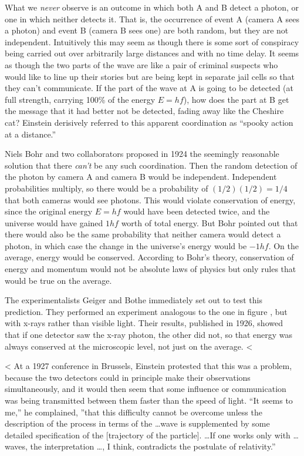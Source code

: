 What we \emph{never} observe is an outcome in which both A and B
detect a photon, or one in which neither detects it. That is, the
occurrence of event A (camera A sees a photon) and event B (camera B
sees one) are both random, but they are not independent. Intuitively
this may seem as though there is some sort of conspiracy being carried
out over arbitrarily large distances and with no time delay. It seems
as though the two parts of the wave are like a pair of criminal
suspects who would like to line up their stories but are being kept in
separate jail cells so that they can't communicate.  If the part of
the wave at A is going to be detected (at full strength, carrying
100\% of the energy $E=hf$), how does the part at B get the message
that it had better not be detected, fading away like the Cheshire cat?
Einstein derisively referred to this apparent coordination as ``spooky
action at a distance.''

Niels Bohr and two collaborators proposed in 1924 the
seemingly reasonable solution that there \emph{can't} be any such
coordination. Then the random detection of the photon by camera A
and camera B would be independent. Independent probabilities multiply,
so there would be a probability of $(1/2)(1/2)=1/4$ that both cameras
would see photons. This would violate conservation of energy, since
the original energy $E=hf$ would have been detected twice, and the universe
would have gained $1hf$ worth of total energy. But Bohr
pointed out that there would also be the same probability that neither
camera would detect a photon, in which case the change in the universe's
energy would be $-1hf$. On the average, energy would be conserved. According
to Bohr's theory, conservation of energy and momentum would not be absolute
laws of physics but only rules that would be true on the average.

The experimentalists Geiger and Bothe immediately set out to test this
prediction. They performed an experiment analogous to the one in
figure , but with x-rays rather than visible
light.  Their results, published in 1926, showed that if one detector
saw the x-ray photon, the other did not, so that energy was always
conserved at the microscopic level, not just on the average.
<%

<%
At a 1927 conference in Brussels, Einstein protested that this was a
problem, because the two detectors could in principle make their
observations simultaneously, and it would then seem that some
influence or communication was being transmitted between them faster
than the speed of light.  ``It seems to me,'' he complained, ''that
this difficulty cannot be overcome unless the description of the
process in terms of the \ldots wave is supplemented by some detailed
specification of the [trajectory of the particle]. \ldots If one works
only with \ldots waves, the interpretation \ldots, I think,
contradicts the postulate of relativity.''

